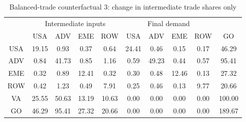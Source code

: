 \begin{table}[p]
\begin{center}
\caption{Balanced-trade counterfactual 3: change in intermediate trade shares only}
\label{tab:iomat-bal-io-counter}
\small
\begin{tabular}{cccccccccc}
\toprule
& \multicolumn{4}{c}{Intermediate inputs}& \multicolumn{4}{c}{Final demand} & \\
\cmidrule(rl){2-5}\cmidrule(rl){6-9}
 &USA &ADV &EME &ROW &USA &ADV &EME &ROW& GO\\
\midrule
USA& 19.15& 0.93& 0.37& 0.64& 24.41& 0.46& 0.15& 0.17& 46.29 \\
ADV& 0.84& 41.73& 0.85& 1.16& 0.59& 49.23& 0.44& 0.57& 95.41 \\
EME& 0.32& 0.89& 12.41& 0.32& 0.30& 0.48& 12.46& 0.13& 27.32 \\
ROW& 0.42& 1.23& 0.49& 7.91& 0.25& 0.46& 0.13& 9.77& 20.66 \\
\midrule
VA& 25.55& 50.63& 13.19& 10.63& 0.00& 0.00& 0.00& 0.00& 100.00\\
\midrule
GO& 46.29& 95.41& 27.32& 20.66& 0.00& 0.00& 0.00& 0.00& 189.67\\
\bottomrule
\end{tabular}
\normalsize
\end{center}
\end{table}

